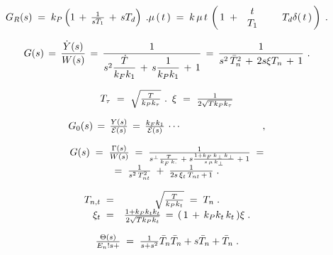 \documentclass{article}
\begin{document}
\[
$$
G_{R} ( s ) \;=\; k_{P} \left( 1 \,+\, \frac{1} {s T_{1}} \,+\, s T_{d} \right) \;.
$$
$$
\mu\, ( \, t \, ) \;=\; k \, \mu\, t \, \left( \, 1 \;+\; \begin{array} {c c c} {t} & {} & {} \\ {T_{1}} & {} & {} \\ \end{array} T_{d} \delta( \, t \, ) \, \right) \;.
$$
\]

\[
$$
\begin{array} {c} {G ( s ) \,=\, {\displaystyle\frac{\dot{Y} ( s )} {W ( s )}} \,=\, {\displaystyle\frac{1} {s^{2} \displaystyle\frac{\dot{T}} {k_{F} k_{1}} \,+\, s \displaystyle\frac{1} {k_{P} k_{1}} \,+\, 1}} \,=\, {\displaystyle\frac{1} {s^{2} \, \bar{T}_{n}^{2} \,+\, 2 s \xi T_{n} \,+\, 1}} \, \,.} \\ \end{array}
$$
\]

\[
$$
T_{\tau} \ =\ \sqrt{\frac{T} {k_{P} k_{\tau}}} \ . \ \, \xi\ =\ \frac{1} {2 \sqrt{T k_{P} k_{\tau}}}
$$
\]

\[
$$
G_{0} ( s ) \,=\, {\frac{Y ( s )} {{\cal E} ( s )}} \,=\, {\frac{k_{F} k_{1}} {{\cal E} ( s )}} \, \cdots\quad\quad\quad\quad\quad\quad\quad\quad\,,
$$
\]

\[
$$
\begin{array} {c} {{G ( s ) \;=\; {\frac{\Gamma( s )} {W ( s )}} \;=\; {\frac{1} {s^{\bot} {\frac{T} {k_{F} \, k_{\cdot}}} \;+\; s {\frac{1+k_{F} \, k_{\bot} \, k_{\bot}} {s \, \mu\, k_{\bot}}} \;+\; 1}} \;=}} \\ {{=\; {\frac{1} {s^{2} \, T_{n t}^{2}} \;+\; {\frac{1} {2 s \, \xi_{t} \, T_{n t} \,+\, 1}} \;.}}} \end{array}
$$
\]

\[
$$
\begin{array} {r c l} {T_{n, t} \;=} & {\sqrt{\frac{T} {k_{P} k_{t}}} \;=\; T_{n} \;.} \\ {\xi_{t} \;=} & {\frac{1+k_{P} k_{t} k_{t}} {2 \sqrt{T k_{P} k_{t}}} \,=\, ( \, 1 \,+\, k_{P} k_{t} \, k_{t} \, ) \xi\;.} \\ \end{array}
$$
\]

\[
$$
\frac{\Theta( s )} {E_{n}! s+} \;=\; \frac{1} {s+s^{2}} \bar{T}_{n} \bar{T}_{n}+s \bar{T}_{n}+\bar{T}_{n} \;.
$$
\]
\end{document}

